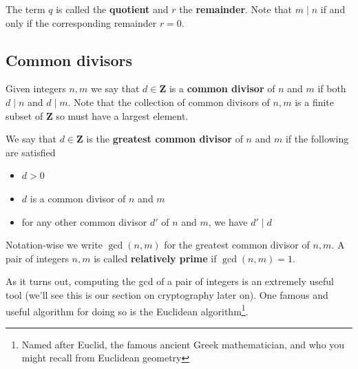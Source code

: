 \documentclass[12pt]{article}
\numberwithin{equation}{subsection}
\theoremstyle{note}
\begin{document}
The term $q$ is called the \textbf{quotient} and $r$ the \textbf{remainder}. Note that $m \mid n$ if and only if the corresponding remainder $r=0$. 

\subsection{Common divisors}
Given integers $n,m$ we say that $d\in \mathbf{Z}$ is a \textbf{common divisor} of $n$ and $m$ if both $d\mid n$ and $d\mid m$. Note that the collection of common divisors of $n,m$ is a finite subset of $\mathbf{Z}$ so must have a largest element. 

We say that $d\in \mathbf{Z}$ is the \textbf{greatest common divisor} of $n$ and $m$ if the following are satisfied
\begin{itemize}
	\item $d>0$ 
	\item $d$ is a common divisor of $n$ and $m$ 
	\item for any other common divisor $d'$ of $n$ and $m$, we have $d'\mid d$
\end{itemize}
Notation-wise we write $\gcd(n,m)$ for the greatest common divisor of $n,m$. A pair of integers $n,m$ is called \textbf{relatively prime} if $\gcd(n,m)=1$. 




As it turns out, computing the gcd of a pair of integers is an extremely useful tool (we'll see this is our section on cryptography later on). One famous and useful algorithm for doing so is the Euclidean algorithm\footnote{Named after Euclid, the famous ancient Greek mathematician, and who you might recall from Euclidean geometry}.
\end{document}
